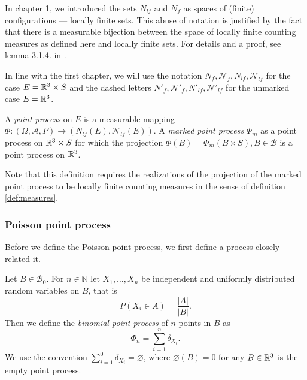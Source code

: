 \begin{remark}
In chapter 1, we introduced the sets $N_{lf}$ and $N_f$ as spaces of (finite) configurations --- locally finite sets. This abuse of notation is justified by the fact that there is a measurable bijection between the space of locally finite counting measures as defined here and locally finite sets. For details and a proof, see lemma 3.1.4. in \cite{SchneiderWeil2008}.   
\end{remark}

In line with the first chapter, we will use the notation $N_{f},\mathcal N_{f}, N_{lf}, \mathcal N_{lf}$ for the case $E={\mathbb R^3}\times S$ and the dashed letters $N'_{f},\mathcal N'_{f}, N'_{lf}, \mathcal N'_{lf}$ for the unmarked case $E={\mathbb R^3}$. 


\begin{definition}
A \textit{point process} on $E$ is a measurable mapping $\Phi:(\Omega,\mathcal A, P) \to (N_{lf}(E),\mathcal N_{lf}(E))$. \newline
A \textit{marked point process} $\Phi_m$ as a point process on ${\mathbb R^3}\times S$ for which the projection $\Phi(B)=\Phi_m(B\times S), B \in \mathcal B$ is a point process on ${\mathbb R^3}$.

\end{definition}
Note that this definition requires the realizations of the projection of the marked point process to be locally finite counting measures in the sense of definition \ref{def:measures}.


\subsubsection{Poisson point process}
Before we define the Poisson point process, we first define a process closely related it.

\begin{definition} Let $B \in \mathcal B_0$. For $n\in \mathbb N$ let $X_1,\dots,X_n$ be independent and uniformly distributed random variables on $B$, that is
$$P(X_i \in A) = \frac{|A|}{|B|}.$$
Then we define the \textit{binomial point process} of $n$ points in $B$ as
$$\Phi_n = \sum^{n}_{i=1}  \delta_{X_i}.$$
We use the convention $\sum^0_{i=1} \delta_{X_i} = \varnothing$, where $\varnothing(B)=0$ for any $B\in {\mathbb R^3}$ is the empty point process.
\end{definition}

